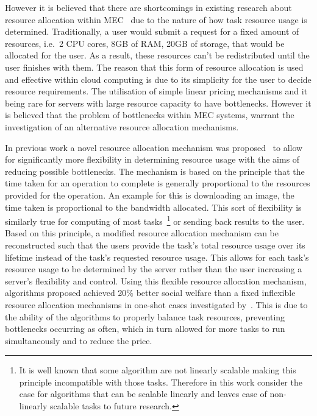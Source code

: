 However it is believed that there are shortcomings in existing research about resource allocation within
MEC~\citep{vaji_infocom, Bi2019} due to the nature of how task resource usage is determined. Traditionally,
a user would submit a request for a fixed amount of resources, i.e.\ 2 CPU cores, 8GB of RAM, 20GB of storage, that
would be allocated for the user. As a result, these resources can't be redistributed until the user finishes with them.
The reason that this form of resource allocation is used and effective within cloud computing is due to its simplicity
for the user to decide resource requirements. The utilisation of simple linear pricing mechanisms and it being rare for
servers with large resource capacity to have bottlenecks. However it is believed that the problem of bottlenecks within
MEC systems, warrant the investigation of an alternative resource allocation mechanisms.

In previous work a novel resource allocation mechanism was proposed~\citep{FlexibleResourceAllocation} to allow for
significantly more flexibility in determining resource usage with the aims of reducing possible
bottlenecks. The mechanism is based on the principle that the time taken for an operation to complete is generally
proportional to the resources provided for the operation. An example for this is downloading an image, the time taken
is proportional to the bandwidth allocated. This sort of flexibility is similarly true for computing of most
tasks~\footnote{It is well known that some algorithm are not linearly scalable making this principle incompatible with
those tasks. Therefore in this work consider the case for algorithms that can be scalable linearly and leaves case of
non-linearly scalable tasks to future research.} or sending back results to the user. \\
Based on this principle, a modified resource allocation mechanism can be
reconstructed such that the users provide the task's total resource usage over its lifetime instead of the task's
requested resource usage. This allows for each task's resource usage to be determined by the server rather than the user
increasing a server's flexibility and control. Using this flexible resource allocation mechanism, algorithms proposed
achieved 20\% better social welfare than a fixed inflexible resource allocation mechanisms in one-shot cases
investigated by~\cite{FlexibleResourceAllocation}. This is due to the ability of the algorithms to properly balance
task resources, preventing bottlenecks occurring as often, which in turn allowed for more tasks to run simultaneously
and to reduce the price.

